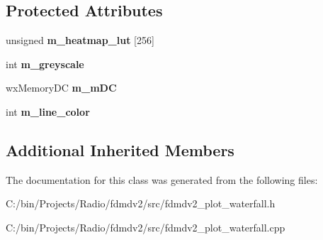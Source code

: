 \subsection*{Protected Attributes}
\begin{DoxyCompactItemize}
\item 
\hypertarget{class_plot_waterfall_aae04482318331ac760954376f23a1e3c}{unsigned {\bfseries m\-\_\-heatmap\-\_\-lut} \mbox{[}256\mbox{]}}\label{class_plot_waterfall_aae04482318331ac760954376f23a1e3c}

\item 
\hypertarget{class_plot_waterfall_a1cb3639849f17b1882b2b3713fd690cf}{int {\bfseries m\-\_\-greyscale}}\label{class_plot_waterfall_a1cb3639849f17b1882b2b3713fd690cf}

\item 
\hypertarget{class_plot_waterfall_a1b80aa40a1194ece27c87ec265ef7d2c}{wx\-Memory\-D\-C {\bfseries m\-\_\-m\-D\-C}}\label{class_plot_waterfall_a1b80aa40a1194ece27c87ec265ef7d2c}

\item 
\hypertarget{class_plot_waterfall_aa0b8f5bb510697a7eb8f48628a39b9c7}{int {\bfseries m\-\_\-line\-\_\-color}}\label{class_plot_waterfall_aa0b8f5bb510697a7eb8f48628a39b9c7}

\end{DoxyCompactItemize}
\subsection*{Additional Inherited Members}


The documentation for this class was generated from the following files\-:\begin{DoxyCompactItemize}
\item 
C\-:/bin/\-Projects/\-Radio/fdmdv2/src/fdmdv2\-\_\-plot\-\_\-waterfall.\-h\item 
C\-:/bin/\-Projects/\-Radio/fdmdv2/src/fdmdv2\-\_\-plot\-\_\-waterfall.\-cpp\end{DoxyCompactItemize}

